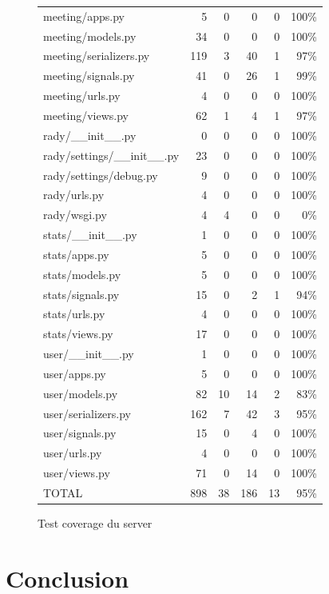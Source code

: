 \documentclass[french]{article}
\begin{document}
\begin{figure}
\begin{tabular}{|l| r r r r r|}
		meeting/apps.py & 5 & 0 & 0 & 0 & 100\% \\
		meeting/models.py & 34 & 0 & 0 & 0 & 100\% \\
		meeting/serializers.py & 119 & 3 & 40 & 1 & 97\% \\
		meeting/signals.py & 41 & 0 & 26 & 1 & 99\% \\
		meeting/urls.py & 4 & 0 & 0 & 0 & 100\% \\
		meeting/views.py & 62 & 1 & 4 & 1 & 97\% \\
		rady/\_\_init\_\_.py & 0 & 0 & 0 & 0 & 100\% \\
		rady/settings/\_\_init\_\_.py & 23 & 0 & 0 & 0 & 100\% \\
		rady/settings/debug.py & 9 & 0 & 0 & 0 & 100\% \\
		rady/urls.py & 4 & 0 & 0 & 0 & 100\% \\
		rady/wsgi.py & 4 & 4 & 0 & 0 & 0\% \\
		stats/\_\_init\_\_.py & 1 & 0 & 0 & 0 & 100\% \\
		stats/apps.py & 5 & 0 & 0 & 0 & 100\% \\
		stats/models.py & 5 & 0 & 0 & 0 & 100\% \\
		stats/signals.py & 15 & 0 & 2 & 1 & 94\% \\
		stats/urls.py & 4 & 0 & 0 & 0 & 100\% \\
		stats/views.py & 17 & 0 & 0 & 0 & 100\% \\
		user/\_\_init\_\_.py & 1 & 0 & 0 & 0 & 100\% \\
		user/apps.py & 5 & 0 & 0 & 0 & 100\% \\
		user/models.py & 82 & 10 & 14 & 2 & 83\% \\
		user/serializers.py & 162 & 7 & 42 & 3 & 95\% \\
		user/signals.py & 15 & 0 & 4 & 0 & 100\% \\
		user/urls.py & 4 & 0 & 0 & 0 & 100\% \\
		user/views.py & 71 & 0 & 14 & 0 & 100\% \\
		\hline \hline
		TOTAL & 898 & 38 & 186 & 13 & 95\% \\
		\hline
		\end{tabular}
		\caption{Test coverage du server}\label{tab:coverage}
	\end{figure}
	
	\newpage
	
		\section{Conclusion}
		
\end{document}
